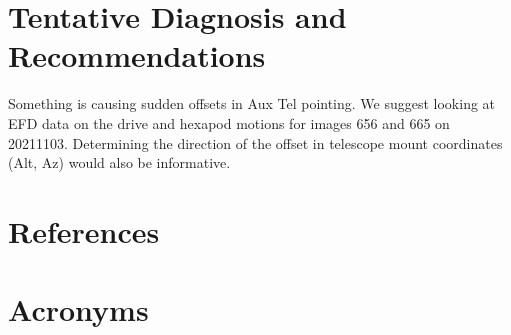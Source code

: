 \documentclass[SE,authoryear,toc]{lsstdoc}
\begin{document}
\section{Tentative Diagnosis and Recommendations}

Something is causing sudden offsets in Aux Tel pointing. We suggest looking at EFD data on the drive and hexapod motions for images 656 and 665 on 20211103. Determining the direction of the offset in telescope mount coordinates (Alt, Az) would also be informative. 

\appendix
\section{References} \label{sec:bib}
\renewcommand{\refname}{} %


\section{Acronyms} \label{sec:acronyms}

\end{document}
